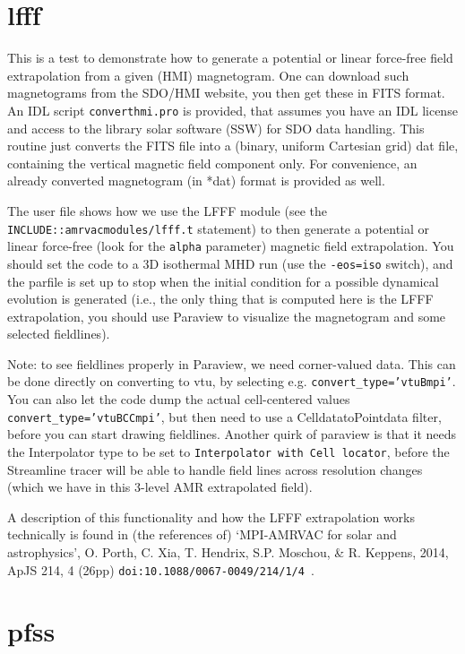 \documentclass[10pt]{article}
\begin{document}
\section*{lfff}

This is a test to demonstrate how to generate a potential or linear force-free field extrapolation from a given (HMI) magnetogram. One can download such magnetograms from the SDO/HMI website, you then get these in FITS format. An IDL script {\tt converthmi.pro} is provided, that assumes you have an IDL license and access to the library solar software (SSW) for SDO data handling. This routine just converts the FITS file into a (binary, uniform Cartesian grid) dat file, containing the vertical magnetic field component only. For convenience, an already converted magnetogram (in *dat) format is provided as well.

The user file shows how we use the LFFF module (see the {\tt INCLUDE::amrvacmodules/lfff.t} statement) to then generate a potential or linear force-free (look for the {\tt alpha} parameter) magnetic field extrapolation. You should set the code to a 3D isothermal MHD run (use the {\tt -eos=iso} switch), and the parfile is set up to stop when the initial condition for a possible dynamical evolution is generated (i.e., the only thing that is computed here is the LFFF extrapolation, you should use Paraview to visualize the magnetogram and some selected fieldlines).

Note: to see fieldlines properly in Paraview, we need corner-valued data. This can be done directly on converting to vtu, by selecting e.g. {\tt convert\_type='vtuBmpi'}. You can also let the code dump the actual cell-centered values {\tt convert\_type='vtuBCCmpi'}, but then need to use a CelldatatoPointdata filter, before you can start drawing fieldlines. Another quirk of paraview is that it needs the Interpolator type to be set to {\tt Interpolator with Cell locator}, before the Streamline tracer will be able to handle field lines across resolution changes (which we have in this 3-level AMR extrapolated field).

A description of this functionality and how the LFFF extrapolation works technically is found in (the references of)
`MPI-AMRVAC for solar and astrophysics', O. Porth, C. Xia, T. Hendrix, S.P. Moschou, \& R. Keppens, 2014, ApJS 214, 4 (26pp) {\tt doi:10.1088/0067-0049/214/1/4 }.

\section*{pfss}
\end{document}
